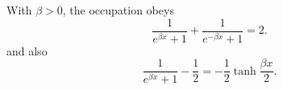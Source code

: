 \documentclass{article}
\begin{document}
With $\beta>0$, the occupation obeys
\begin{equation}
\frac{1}{e^{\beta x}+1} + \frac{1}{e^{-\beta x}+1} = 2 .
\label{eq:a}
\end{equation}
and also
\begin{equation}
\frac{1}{e^{\beta x}+1} - \frac{1}{2} = -\frac{1}{2}\tanh\frac{\beta x}{2} .
\label{eq:a}
\end{equation}
\end{document}

